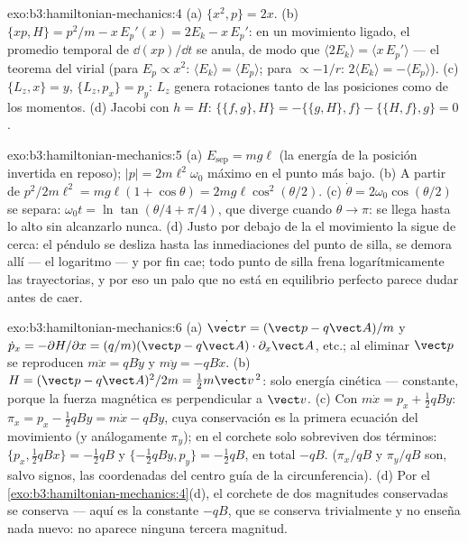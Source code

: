 \begin{solution}{exo:b3:hamiltonian-mechanics:4}
(a) $\{x^2, p\} = 2x$. (b) $\{xp, H\} = p^2/m - x\,E_p'(x) = 2E_k -
x\,E_p'$: en un movimiento ligado, el promedio temporal de $\dd(xp)/\dd t$
se anula, de modo que $\langle 2E_k\rangle = \langle x\,E_p'\rangle$ --- el
teorema del virial (para $E_p \propto x^2$: $\langle E_k\rangle = \langle
E_p\rangle$; para $\propto -1/r$: $2\langle E_k\rangle = -\langle
E_p\rangle$). (c) $\{L_z, x\} = y$, $\{L_z, p_x\} = p_y$: $L_z$
genera rotaciones tanto de las posiciones como de los momentos. (d) Jacobi con $h
= H$: $\{\{f, g\}, H\} = -\{\{g, H\}, f\} - \{\{H, f\}, g\} = 0$.
\end{solution}

\begin{solution}{exo:b3:hamiltonian-mechanics:5}
(a) $E_{\text{sep}} = mg\ell$ (la energía de la posición invertida en
reposo); $|p| = 2m\ell^2\omega_0$ máximo en el punto más bajo. (b) A partir
de $p^2/2m\ell^2 = mg\ell(1 + \cos\theta) = 2mg\ell\cos^2(\theta/2)$. (c)
$\dot\theta = 2\omega_0\cos(\theta/2)$ se separa: $\omega_0t =
\ln\tan(\theta/4 + \pi/4)$, que diverge cuando $\theta \to \pi$: se llega
hasta lo alto sin alcanzarlo nunca. (d) Justo por debajo de la  el
movimiento la sigue de cerca: el péndulo se desliza hasta las inmediaciones
del punto de silla, se demora allí --- el logaritmo --- y por fin cae; todo
punto de silla frena logarítmicamente las trayectorias, y por eso un palo
que no está en equilibrio perfecto parece dudar antes de caer.
\end{solution}

\begin{solution}{exo:b3:hamiltonian-mechanics:6}
(a) $\dot{\vect r} = (\vect p - q\vect A)/m$ y $\dot p_x =
-\partial H/\partial x = (q/m)(\vect p - q\vect A)\cdot\partial_x\vect
A$, etc.; al eliminar $\vect p$ se reproducen $m\ddot x = qB\dot y$ y
$m\ddot y = -qB\dot x$. (b) $H = (\vect p - q\vect A)^2/2m = \tfrac12
m\vect v^{\,2}$: solo energía cinética --- constante, porque la fuerza
magnética es perpendicular a $\vect v$. (c) Con $m\dot x = p_x +
\tfrac12 qBy$: $\pi_x = p_x - \tfrac12 qBy = m\dot x - qBy$, cuya
conservación es la primera ecuación del movimiento (y análogamente $\pi_y$);
en el corchete solo sobreviven dos términos: $\{p_x, \tfrac12 qBx\} = -\tfrac12
qB$ y $\{-\tfrac12 qBy, p_y\} = -\tfrac12 qB$, en total $-qB$. ($\pi_x/qB$ y $\pi_y/qB$
son, salvo signos, las coordenadas del centro guía de la
circunferencia). (d) Por el \cref{exo:b3:hamiltonian-mechanics:4}(d), el
corchete de dos magnitudes conservadas se conserva --- aquí es la constante
$-qB$, que se conserva trivialmente y no enseña nada nuevo: no aparece
ninguna tercera magnitud.
\end{solution}

